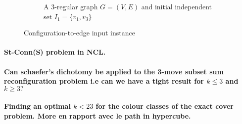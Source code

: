 \begin{figure}[H]
\begin{subfigure}[b]{0.4\textwidth}
\begin{scaletikzpicturetowidth}{\textwidth}
        \end{scaletikzpicturetowidth}
        \caption{A $3$-regular graph $G=(V,E)$ and initial independent set $I_1 = \{v_1, v_3\}$}
        \label{fig:s13}
    \end{subfigure}
    \caption{Configuration-to-edge input instance}
    \label{fig:s2}
\end{figure}


\paragraph{St-Conn(S) problem in NCL.}

\paragraph{Can schaefer's dichotomy be applied to the 3-move subset sum reconfiguration problem i.e can we have a tight result for $k \leq 3$ and $k \geq 3 ? $}

\paragraph{Finding an optimal $k < 23$ for the colour classes of the exact cover problem. More en rapport avec le path in hypercube.}
